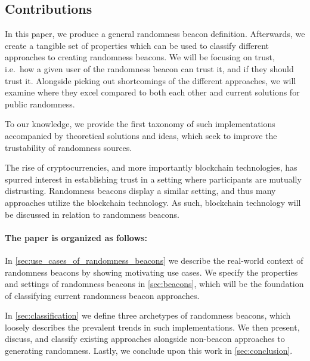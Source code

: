 \subsection*{Contributions}\label{subsec:contributions}
In this paper, we produce a general randomness beacon definition. Afterwards, we create a tangible set of properties which can be used to classify different approaches to creating randomness beacons.
We will be focusing on trust, i.e.\ how a given user of the randomness beacon can trust it, and if they should trust it.
Alongside picking out shortcomings of the different approaches, we will examine where they excel compared to both each other and current solutions for public randomness.

To our knowledge, we provide the first taxonomy of such implementations accompanied by theoretical solutions and ideas, which seek to improve the trustability of randomness sources.

The rise of cryptocurrencies, and more importantly blockchain technologies, has spurred interest in establishing trust in a setting where participants are mutually distrusting.
Randomness beacons display a similar setting, and thus many approaches utilize the blockchain technology.
As such, blockchain technology will be discussed in relation to randomness beacons.

\paragraph{The paper is organized as follows:}
In \cref{sec:use_cases_of_randomness_beacons} we describe the real-world context of randomness beacons by showing motivating use cases.
We specify the properties and settings of randomness beacons in \cref{sec:beacons}, which will be the foundation of classifying current randomness beacon approaches.

In \cref{sec:classification} we define three archetypes of randomness beacons, which loosely describes the prevalent trends in such implementations.
We then present, discuss, and classify existing approaches alongside non-beacon approaches to generating randomness.
Lastly, we conclude upon this work in \cref{sec:conclusion}.

